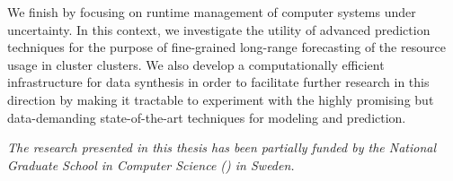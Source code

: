 We finish by focusing on runtime management of computer systems under
uncertainty. In this context, we investigate the utility of advanced prediction
techniques for the purpose of fine-grained long-range forecasting of the
resource usage in cluster clusters. We also develop a computationally efficient
infrastructure for data synthesis in order to facilitate further research in
this direction by making it tractable to experiment with the highly promising
but data-demanding state-of-the-art techniques for modeling and prediction.

\vspace{1em}
\noindent
\emph{The research presented in this thesis has been partially funded by the
National Graduate School in Computer Science () in Sweden.}
